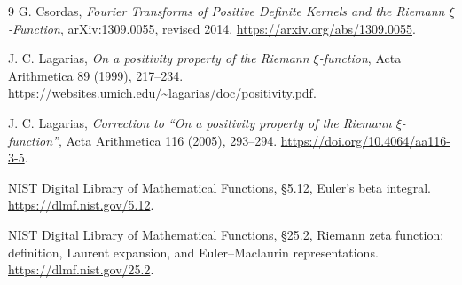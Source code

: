 \documentclass[11pt,letterpaper]{article}
\numberwithin{equation}{section}
\theoremstyle{remark}\newtheorem{remark}[theorem]{Remark}
\begin{document}
\begin{thebibliography}{9}
G. Csordas, \emph{Fourier Transforms of Positive Definite Kernels and the Riemann $\xi$-Function}, arXiv:1309.0055, revised 2014.
\url{https://arxiv.org/abs/1309.0055}.

J. C. Lagarias, \emph{On a positivity property of the Riemann $\xi$-function}, Acta Arithmetica 89 (1999), 217--234.
\url{https://websites.umich.edu/~lagarias/doc/positivity.pdf}.

J. C. Lagarias, \emph{Correction to ``On a positivity property of the Riemann $\xi$-function''}, Acta Arithmetica 116 (2005), 293--294.
\url{https://doi.org/10.4064/aa116-3-5}.

NIST Digital Library of Mathematical Functions, \S5.12, Euler's beta integral.
\url{https://dlmf.nist.gov/5.12}.

NIST Digital Library of Mathematical Functions, \S25.2, Riemann zeta function: definition, Laurent expansion, and Euler--Maclaurin representations.
\url{https://dlmf.nist.gov/25.2}.
\end{thebibliography}
\end{document}
